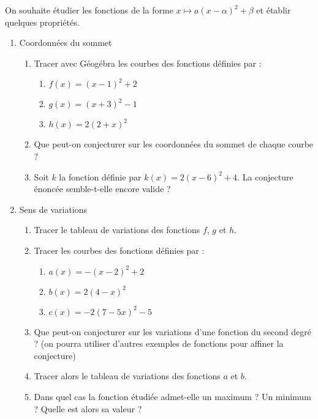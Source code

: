 
On souhaite étudier les fonctions de la forme $x \mapsto a(x-\alpha)^2 + \beta$ et établir quelques propriétés.

\begin{enumerate}
\item Coordonnées du sommet
\begin{enumerate}
\item Tracer avec Géogébra les courbes des fonctions définies par :
\begin{enumerate}
\item $f(x)=(x-1)^2+2$
\item $g(x)=(x+3)^2-1$
\item $h(x)=2(2+x)^2$
\end{enumerate}
\item Que peut-on conjecturer sur les coordonnées du sommet de chaque courbe ?
\item Soit $k$ la fonction définie par $k (x)=2(x-6)^2+4$. La conjecture énoncée semble-t-elle encore valide ?
\end{enumerate}

\item Sens de variations
\begin{enumerate}
\item Tracer le tableau de variations des fonctions $f$, $g$ et $h$.
\item Tracer les courbes des fonctions définies par :
\begin{enumerate}
\item $a(x)=-(x-2)^2+2$
\item $b(x)=2(4-x)^2$
\item $c(x)=-2(7-5x)^2-5$
\end{enumerate}
\item Que peut-on conjecturer sur les variations d'une fonction du second degré ? (on pourra utiliser d'autres
exemples de fonctions pour affiner la conjecture)
\item Tracer alors le tableau de variations des fonctions $a$ et $b$.
\item Dans quel cas la fonction étudiée admet-elle un maximum ? Un minimum ? Quelle est alors sa valeur ?
\end{enumerate}
\end{enumerate}
